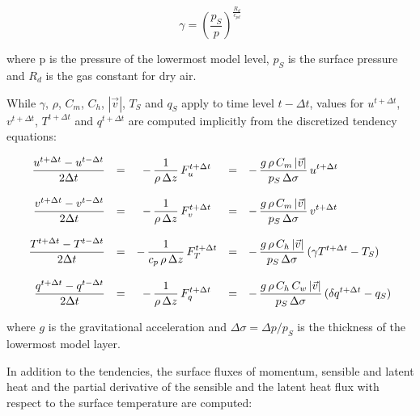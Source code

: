 \begin{equation}\label{gamma}
\gamma = \left(\frac{p_S}{p}\right)^{\frac{R_d}{c_{pd}}}
\end{equation}

 where p is the pressure of the lowermost
model level, $p_S$ is the surface pressure and $R_d$
is the gas constant for dry air.  

While $\gamma$, $\rho$,
$C_m$, $C_h$, 
$|\vec{v}|$,
$T_S$ and  $q_S$ apply to time level $t - \Delta t$,
values
for $u^{t+ \Delta t}$, $v^{t+ \Delta t}$, $T^{t+ \Delta
t}$
and $q^{t+ \Delta t}$ are computed implicitly
from the discretized tendency equations:

\begin{equation}
\begin{array}{rcccl}
\displaystyle \frac{u^{t+\Delta t}-u^{t-\Delta t}}{2 \Delta
t} & = & \displaystyle -
\,
\frac{1}{\rho \, \Delta z}\, F_u^{t+\Delta t} & = & \displaystyle
- \,
\frac
{g \, \rho \, C_m  \, |\vec{v}|}{p_S \, \Delta \sigma} \,
u^{t +
\Delta t}  \\  
&&&& \\
\displaystyle \frac{v^{t+\Delta t}-v^{t-\Delta t}}{2 \Delta t} & =
&
\displaystyle  
- \,
\frac{1}{\rho \, \Delta z}\, F_v^{t+\Delta t} & = & \displaystyle
- \,
\frac
{g \, \rho \, C_m \, |\vec{v}|}{p_S \, \Delta \sigma} \,
v^{t +
\Delta t} \\
&&&& \\
\displaystyle \frac{T^{t+\Delta t}-T^{t-\Delta t}}{2 \Delta t}  &
= &
\displaystyle 
-\,
\frac{1}{c_p \, \rho \, \Delta z} \, F_T^{t+\Delta t} &
= & \displaystyle -
\,
\frac{g \, \rho \, C_h  \, |\vec{v}|}  {p_S \, \Delta
\sigma} \,
(\gamma T^{t + \Delta t} - T_S)  \\
&&&& \\
\displaystyle \frac{q^{t+\Delta t}-q^{t-\Delta t}}{2 \Delta t} & =
&
\displaystyle -
\,
\frac{1}{\rho \, \Delta z} \, F_q^{t+\Delta t}& = & \displaystyle 
- \, 
\frac{g \, \rho \, C_h \, C_w \, |\vec{v}|}  {p_S \, \Delta
\sigma} \,
(\delta q^{t + \Delta t} - q_S)
\end{array}
\end{equation}

where $g$  is the gravitational acceleration and $\Delta
\sigma = \Delta p/p_S $ is the thickness of the
lowermost model layer. 

In addition to the tendencies, the surface fluxes of
momentum, sensible and latent heat and the
partial derivative of the sensible and the latent heat flux 
with respect to the surface temperature
are computed:

